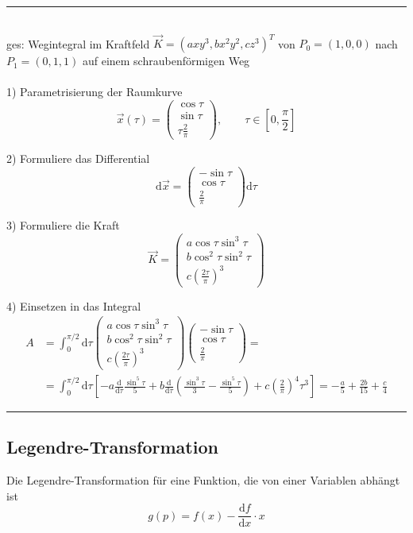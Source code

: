 \documentclass{article}
\newcommand{\diff}{\mathrm{d}}
\newcommand{\lr}[1]{\left(#1\right)}
\newcommand{\lreck}[1]{\left[#1\right]}
\begin{document}
\vspace{0.5cm}

{\color{blue}
\hrule
	\\
	ges: Wegintegral im Kraftfeld $\vec{K} = (axy^3, bx^2y^2, cz^3)^T$ von $P_0 = (1,0,0)$ nach $P_1 = (0,1,1)$ auf einem schraubenförmigen Weg\\
	\\
	1) Parametrisierung der Raumkurve
		$$\vec{x}(\tau) = 
		\begin{pmatrix}
			\cos\tau \\ \sin\tau \\ \tau \frac{2}{\pi}
		\end{pmatrix},\qquad \tau\in [0,\frac{\pi}{2}]$$
	
	2) Formuliere das Differential
		$$\diff\vec{x} =
		\begin{pmatrix}
			-\sin\tau \\ \cos\tau \\ \frac{2}{\pi}
		\end{pmatrix} \diff\tau$$
	
	3) Formuliere die Kraft
		$$\vec{K} = 
		\begin{pmatrix}
			a\cos\tau\sin^3\tau \\
			b\cos^2\tau\sin^2\tau \\
			c \lr{\frac{2\tau}{\pi}}^3
		\end{pmatrix}$$
	
	4) Einsetzen in das Integral
		\begin{align*}
			A &= \int_0^{\pi/2} \diff\tau \begin{pmatrix}
			a\cos\tau\sin^3\tau \\
			b\cos^2\tau\sin^2\tau \\
			c \lr{\frac{2\tau}{\pi}}^3
		\end{pmatrix} \begin{pmatrix}
			-\sin\tau \\ \cos\tau \\ \frac{2}{\pi}
		\end{pmatrix} = \\
			 &= \int_0^{\pi/2} \diff\tau \lreck{ -a \frac{\diff}{\diff \tau} \frac{\sin^5\tau}{5}  + b \frac{\diff}{\diff\tau} \lr{ \frac{\sin^3\tau}{3} - \frac{\sin^5\tau}{5} } + c \lr{\frac{2}{\pi}}^4 \tau^3 } = -\frac{a}{5} + \frac{2b}{15} + \frac{c}{4}
		\end{align*}
\hrule
}


\newpage


\subsection{Legendre-Transformation}
Die Legendre-Transformation für eine Funktion, die von einer Variablen abhängt ist
	\begin{equation}
		g(p) = f(x) - \frac{\diff f}{\diff x}\cdot x
	\end{equation}
\end{document}
